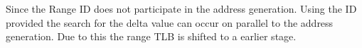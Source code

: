 \documentclass[18pt, a1paper, portrait]{tikzposter}
\newcommand\NameBlock[1]{\node[fit=(blockbody)(blocktitle),inner sep=5pt] (#1) {};}
\begin{document}
\begin{columns}
{    Since the Range ID does not participate in the address generation. Using 
    the ID provided the search for the delta value can occur on parallel to 
    the address generation. Due to this the range TLB is shifted to a 
    earlier stage.
 }
















\end{columns}
\end{document}
